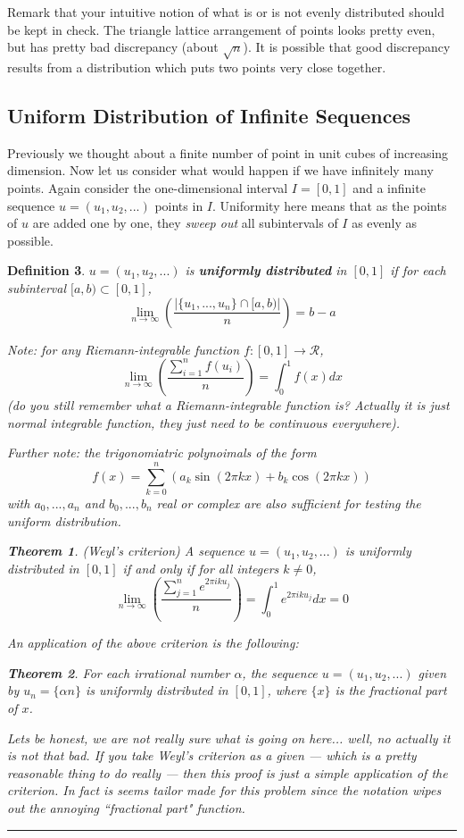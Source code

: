 \documentclass[twoside]{article}
\newcounter{lecnum}
\newtheorem{theorem}{Theorem}[lecnum]
\newtheorem{definition}[theorem]{Definition}
\newenvironment{proof}{{\bf Proof:}}{\hfill\rule{2mm}{2mm}}
\newcommand\R{\mathcal{R}}
\begin{document}
Remark that your intuitive notion of what is or is not evenly distributed should be kept in check. The triangle lattice arrangement of points looks pretty even, but has pretty bad discrepancy (about $\sqrt{n}$). It is possible that good discrepancy results from a distribution which puts two points very close together.  

\subsection{Uniform Distribution of Infinite Sequences}
Previously we thought about a finite number of point in unit cubes of increasing dimension. Now let us consider what would happen if we have infinitely many points. Again consider the one-dimensional interval $I = [0,1]$ and a infinite sequence $u = (u_1, u_2, ...)$ points in $I$. Uniformity here means that as the points of $u$ are added one by one, they \emph{sweep out} all subintervals of $I$ as evenly as possible. 

\begin{definition}
$u = (u_1, u_2, ...)$ is \textbf{uniformly distributed} in $[0,1]$ if for each subinterval $[a, b) \subset [0,1]$,
\[\lim_{n\rightarrow \infty} \left( \frac{\left|\{u_1, ..., u_n\} \cap [a, b)\right|}{n} \right) = b-a\]

Note: for any Riemann-integrable function $f: [0,1] \rightarrow \R$, 
\[\lim_{n\rightarrow \infty} \left( \frac{\sum_{i=1}^{n}f(u_i)}{n} \right) = \int_{0}^{1} f(x) dx\]
(do you still remember what a Riemann-integrable function is? Actually it is just normal integrable function, they just need to be continuous everywhere).

Further note: the trigonomiatric polynoimals of the form
\[f(x) = \sum_{k=0}^{n} \left( a_k \sin(2\pi k x) + b_k \cos (2\pi kx) \right)\]
with $a_0, ..., a_n$ and $b_0, ..., b_n$ real or complex are also sufficient for testing the uniform distribution. 

\begin{theorem}
(Weyl's criterion) A sequence $u = (u_1, u_2, ...)$ is uniformly distributed in $[0,1]$ if and only if for all integers $k \neq 0$,
\[\lim_{n\rightarrow\infty} \left( \frac{\sum_{j=1}^{n} e^{2\pi i ku_j}}{n} \right) = \int_{0}^{1} e^{2\pi iku_j} dx = 0\]
\end{theorem}

An application of the above criterion is the following:
\begin{theorem}
For each irrational number $\alpha$, the sequence $u = (u_1, u_2, ...)$ given by $u_n = \{\alpha n\}$ is uniformly distributed in $[0,1]$, where $\{x\}$ is the fractional part of $x$. 
\end{theorem}
\begin{proof}
Lets be honest, we are not really sure what is going on here... well, no actually it is not that bad. If you take Weyl's criterion as a given --- which is a pretty reasonable thing to do really --- then this proof is just a simple application of the criterion. In fact is seems tailor made for this problem since the notation wipes out the annoying ``fractional part" function.
\end{proof}
\end{definition}
\end{document}
